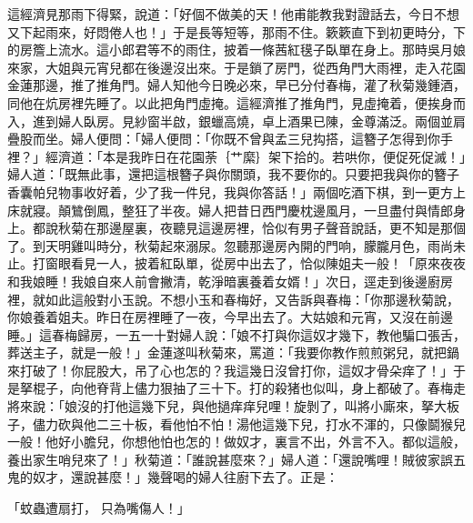 這經濟見那雨下得緊，說道：「好個不做美的天！他甫能教我對證話去，今日不想又下起雨來，好悶倦人也！」于是長等短等，那雨不住。簌簌直下到初更時分，下的房簷上流水。這小郎君等不的雨住，披着一條茜紅氁子臥單在身上。那時吳月娘來家，大姐與元宵兒都在後邊沒出來。于是鎖了房門，從西角門大雨裡，走入花園金蓮那邊，推了推角門。婦人知他今日晚必來，早已分付春梅，灌了秋菊幾鍾酒，同他在炕房裡先睡了。以此把角門虛掩。這經濟推了推角門，見虛掩着，便挨身而入，進到婦人臥房。見紗窗半啟，銀蠟高燒，卓上酒果已陳，金尊滿泛。兩個並肩疊股而坐。婦人便問：「婦人便問：「你既不曾與孟三兒抅搭，這簪子怎得到你手裡？」經濟道：「本是我昨日在花園荼｛艹縻｝架下拾的。若哄你，便促死促滅！」婦人道：「既無此事，還把這根簪子與你關頭，我不要你的。只要把我與你的簪子香囊帕兒物事收好着，少了我一件兒，我與你答話！」兩個吃酒下棋，到一更方上床就寢。顛鷥倒鳳，整狂了半夜。婦人把昔日西門慶枕邊風月，一旦盡付與情郎身上。都說秋菊在那邊屋裏，夜聽見這邊房裡，恰似有男子聲音說話，更不知是那個了。到天明雞叫時分，秋菊起來溺尿。忽聽那邊房內開的門响，朦朧月色，雨尚未止。打窗眼看見一人，披着紅臥單，從房中出去了，恰似陳姐夫一般！「原來夜夜和我娘睡！我娘自來人前會撇清，乾淨暗裏養着女婿！」次日，逕走到後邊廚房裡，就如此這般對小玉說。不想小玉和春梅好，又告訴與春梅：「你那邊秋菊說，你娘養着姐夫。昨日在房裡睡了一夜，今早出去了。大姑娘和元宵，又沒在前邊睡。」這春梅歸房，一五一十對婦人說：「娘不打與你這奴才幾下，教他騙口張舌，葬送主子，就是一般！」金蓮遂叫秋菊來，罵道：「我要你教作煎煎粥兒，就把鍋來打破了！你屁股大，吊了心也怎的？我這幾日沒曾打你，這奴才骨朵痒了！」于是拏棍子，向他脊背上儘力狠抽了三十下。打的殺猪也似叫，身上都破了。春梅走將來說：「娘沒的打他這幾下兒，與他撾痒痒兒哩！旋剝了，叫將小廝來，拏大板子，儘力砍與他二三十板，看他怕不怕！湯他這幾下兒，打水不渾的，只像鬬猴兒一般！他好小膽兒，你想他怕也怎的！做奴才，裏言不出，外言不入。都似這般，養出家生哨兒來了！」秋菊道：「誰說甚麼來？」婦人道：「還說嘴哩！賊彼家誤五鬼的奴才，還說甚麼！」幾聲喝的婦人往廚下去了。正是：

「蚊蟲遭扇打，  只為嘴傷人！」

